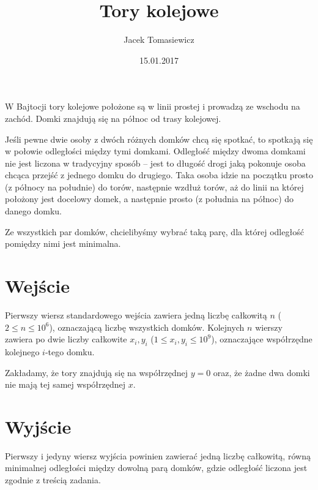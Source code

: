 \documentclass[zad,zawodnik,utf8]{sinol}
\title{Tory kolejowe}
\author{Jacek Tomasiewicz}
\date{15.01.2017}
\begin{document}
  \begin{tasktext}%
 W Bajtocji tory kolejowe położone są w linii prostej i prowadzą ze wschodu na zachód. Domki znajdują się na północ od trasy kolejowej.

Jeśli pewne dwie osoby z dwóch różnych domków chcą się spotkać, to spotkają się w połowie odległości między tymi domkami. Odległość między dwoma domkami nie jest liczona w tradycyjny sposób -- jest to długość drogi jaką pokonuje osoba chcąca przejść z jednego domku do drugiego. Taka osoba idzie na początku prosto (z północy na południe) do torów, następnie wzdłuż torów, aż do linii na której położony jest docelowy domek, a następnie prosto (z południa na północ) do danego domku. 

Ze wszystkich par domków, chcielibyśmy wybrać taką parę, dla której odległość pomiędzy nimi jest minimalna. 

  \section{Wejście}

 Pierwszy wiersz standardowego wejścia zawiera jedną liczbę całkowitą $n$ ($2 \leq n \leq 10^6$), oznaczającą liczbę wszystkich domków. Kolejnych $n$ wierszy zawiera po dwie liczby całkowite $x_i, y_i$ ($1 \leq x_i, y_i \leq 10^9$), oznaczające współrzędne kolejnego $i$-tego domku. 

Zakładamy, że tory znajdują się na współrzędnej $y = 0$ oraz, że żadne dwa domki nie mają tej samej współrzędnej $x$. 

  \section{Wyjście}

 Pierwszy i jedyny wiersz wyjścia powinien zawierać jedną liczbę całkowitą, równą minimalnej odległości między dowolną parą domków, gdzie odległość liczona jest zgodnie z treścią zadania. 

     \makecompactexample


  \end{tasktext}
\end{document}
